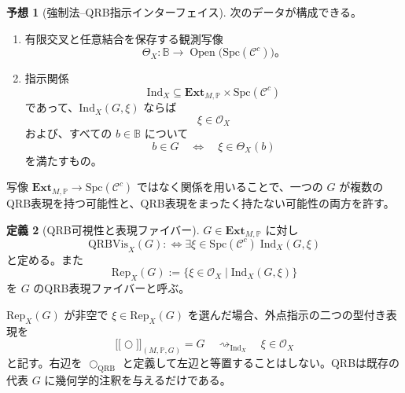 \documentclass[a4paper,11pt]{ltjsarticle}
\theoremstyle{definition}
\newtheorem{definition}{定義}[section]
\newtheorem{conjecture}[definition]{予想}
\theoremstyle{plain}
\newcommand{\QRB}{\mathrm{QRB}}
\newcommand{\Spc}{\mathrm{Spc}}
\newcommand{\Open}{\operatorname{Open}}
\newcommand{\Ext}{\mathbf{Ext}}
\newcommand{\Ind}{\mathrm{Ind}}
\newcommand{\QRBVis}{\mathrm{QRBVis}}
\newcommand{\Rep}{\mathrm{Rep}}
\newcommand{\dfix}{\bigcirc}
\newcommand{\sem}[1]{\mathopen{[\![}#1\mathclose{]\!]}}
\begin{document}
\begin{conjecture}[強制法--QRB指示インターフェイス]
次のデータが構成できる。
\begin{enumerate}
 \item 有限交叉と任意結合を保存する観測写像
 \begin{equation}
  \Theta_X:\mathbb B
  \longrightarrow
  \Open\bigl(\Spc(\mathcal C^c)\bigr)。
  \label{eq:theta}
 \end{equation}
 \item 指示関係
 \begin{equation}
  \Ind_X
  \subseteq
  \Ext_{M,\mathbb P}
  \times\Spc(\mathcal C^c)
  \label{eq:indication-relation}
 \end{equation}
 であって、$\Ind_X(G,\xi)$ ならば
 \begin{equation}
  \xi\in\mathcal O_X
  \label{eq:indication-in-locus}
 \end{equation}
 および、すべての $b\in\mathbb B$ について
 \begin{equation}
  b\in G
  \quad\Longleftrightarrow\quad
  \xi\in\Theta_X(b)
  \label{eq:generic-point-comparison}
 \end{equation}
 を満たすもの。
\end{enumerate}
\end{conjecture}

写像 $\Ext_{M,\mathbb P}\to\Spc(\mathcal C^c)$ ではなく関係を用いることで、一つの $G$ が複数のQRB表現を持つ可能性と、QRB表現をまったく持たない可能性の両方を許す。

\begin{definition}[QRB可視性と表現ファイバー]
$G\in\Ext_{M,\mathbb P}$ に対し
\begin{equation}
 \QRBVis_X(G)
 :\Longleftrightarrow
 \exists\xi\in\Spc(\mathcal C^c)\;
 \Ind_X(G,\xi)
 \label{eq:qrb-visibility}
\end{equation}
と定める。また
\begin{equation}
 \Rep_X(G)
 :=
 \{\xi\in\mathcal O_X
 \mid\Ind_X(G,\xi)\}
 \label{eq:qrb-representation-fiber}
\end{equation}
を $G$ のQRB表現ファイバーと呼ぶ。
\end{definition}

$\Rep_X(G)$ が非空で $\xi\in\Rep_X(G)$ を選んだ場合、外点指示の二つの型付き表現を
\begin{equation}
 \sem{\dfix}_{(M,\mathbb P,G)}=G
 \quad\rightsquigarrow_{\Ind_X}\quad
 \xi\in\mathcal O_X
 \label{eq:typed-external-indication}
\end{equation}
と記す。右辺を $\dfix_{\QRB}$ と定義して左辺と等置することはしない。QRBは既存の代表 $G$ に幾何学的注釈を与えるだけである。
\end{document}
